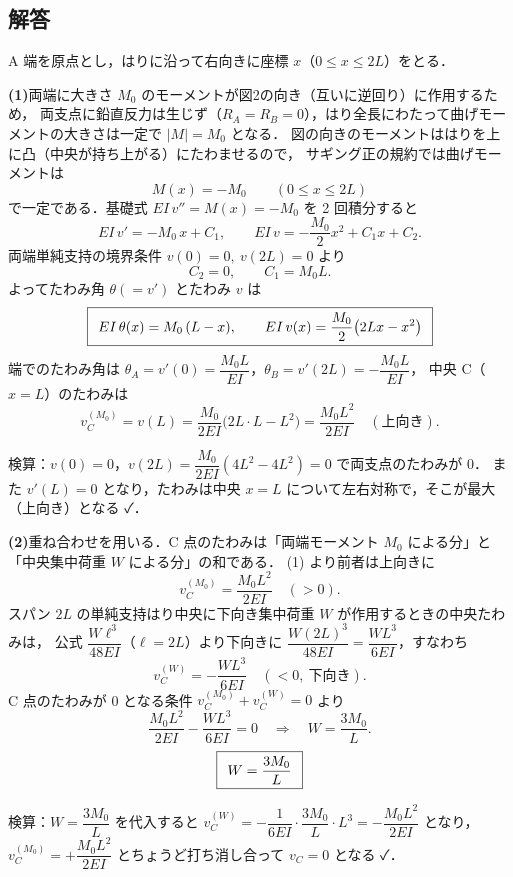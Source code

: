 \documentclass[11pt,a4paper]{article}
\begin{document}
\subsection*{解答}

A 端を原点とし，はりに沿って右向きに座標 $x$（$0\le x\le 2L$）をとる．

\medskip
\noindent\textbf{(1)}\quad 両端に大きさ $M_0$ のモーメントが図2の向き（互いに逆回り）に作用するため，
両支点に鉛直反力は生じず（$R_A=R_B=0$），はり全長にわたって曲げモーメントの大きさは一定で $|M|=M_0$ となる．
図の向きのモーメントははりを上に凸（中央が持ち上がる）にたわませるので，
サギング正の規約では曲げモーメントは
\[
  M(x) = -M_0 \qquad (0\le x\le 2L)
\]
で一定である．基礎式 $EI\,v''=M(x)=-M_0$ を 2 回積分すると
\[
  EI\,v' = -M_0\,x + C_1,\qquad
  EI\,v  = -\frac{M_0}{2}x^2 + C_1 x + C_2 .
\]
両端単純支持の境界条件 $v(0)=0,\ v(2L)=0$ より
\[
  C_2 = 0,\qquad C_1 = M_0 L .
\]
よってたわみ角 $\theta(=v')$ とたわみ $v$ は
\[
  \boxed{\,\;EI\,\theta(x) = M_0\,(L-x),\qquad
        EI\,v(x) = \frac{M_0}{2}\big(2Lx - x^2\big)\;\,}
\]
端でのたわみ角は $\theta_A=v'(0)=\dfrac{M_0 L}{EI}$，$\theta_B=v'(2L)=-\dfrac{M_0 L}{EI}$，
中央 C（$x=L$）のたわみは
\[
  v_C^{(M_0)} = v(L) = \frac{M_0}{2EI}\big(2L\cdot L - L^2\big) = \frac{M_0 L^2}{2EI}\quad(\text{上向き}).
\]

\smallskip
検算：$v(0)=0$，$v(2L)=\dfrac{M_0}{2EI}(4L^2-4L^2)=0$ で両支点のたわみが 0．
また $v'(L)=0$ となり，たわみは中央 $x=L$ について左右対称で，そこが最大（上向き）となる ✓．

\medskip
\noindent\textbf{(2)}\quad 重ね合わせを用いる．C 点のたわみは「両端モーメント $M_0$ による分」と
「中央集中荷重 $W$ による分」の和である．
(1) より前者は上向きに
\[
  v_C^{(M_0)} = \frac{M_0 L^2}{2EI}\quad(>0).
\]
スパン $2L$ の単純支持はり中央に下向き集中荷重 $W$ が作用するときの中央たわみは，
公式 $\dfrac{W\ell^3}{48EI}$（$\ell=2L$）より下向きに $\dfrac{W(2L)^3}{48EI}=\dfrac{WL^3}{6EI}$，すなわち
\[
  v_C^{(W)} = -\frac{WL^3}{6EI}\quad(<0,\ \text{下向き}).
\]
C 点のたわみが 0 となる条件 $v_C^{(M_0)}+v_C^{(W)}=0$ より
\[
  \frac{M_0 L^2}{2EI} - \frac{WL^3}{6EI} = 0
  \quad\Longrightarrow\quad
  W = \frac{3M_0}{L}.
\]
\[
  \boxed{\,\;W = \dfrac{3M_0}{L}\;\,}
\]

\smallskip
検算：$W=\dfrac{3M_0}{L}$ を代入すると
$v_C^{(W)}=-\dfrac{1}{6EI}\cdot\dfrac{3M_0}{L}\cdot L^3=-\dfrac{M_0 L^2}{2EI}$ となり，
$v_C^{(M_0)}=+\dfrac{M_0 L^2}{2EI}$ とちょうど打ち消し合って $v_C=0$ となる ✓．
\end{document}
